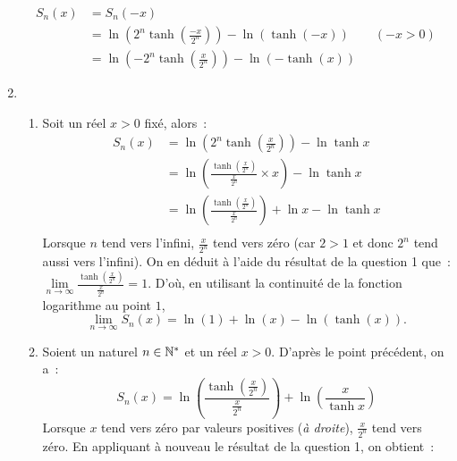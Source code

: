 \begin{exercice}
\begin{enumerate}
            \begin{align*}
                S_n(x)  &= S_n(-x) \\
                        &= \ln\left(2^n\tanh\left(\frac{-x}{2^n}\right)\right) - \ln(\tanh(-x)) \qquad (-x>0)\\
                        &= \ln\left(-2^n\tanh\left(\frac{x}{2^n}\right)\right) - \ln(-\tanh(x))
            \end{align*}
        \item 
            \begin{enumerate}
                \item Soit un réel \(x>0\) fixé, alors~:
                    \begin{align*}
                        S_n(x)  &= \ln\left(2^n\tanh\left(\frac{x}{2^n}\right)\right) - \ln\tanh x\\
                        &= \ln\left(\frac{\tanh\left(\frac{x}{2^n}\right)}{\frac{x}{2^n}} \times x \right) - \ln\tanh x\\
                        &= \ln\left(\frac{\tanh\left(\frac{x}{2^n}\right)}{\frac{x}{2^n}} \right) + \ln x - \ln\tanh x\\
                    \end{align*}
                        Lorsque \(n\) tend vers l'infini, \(\frac{x}{2^n}\) tend vers zéro (car \(2>1\) et donc \(2^n\) tend aussi vers l'infini). On en déduit à l'aide du résultat de la question 1 que~: \(\lim\limits_{n\to \infty} \frac{\tanh\left(\frac{x}{2^n}\right)}{\frac{x}{2^n}} = 1\). D'où, en utilisant la continuité de la fonction logarithme au point \(1\),
                    \begin{equation*}
                        \lim\limits_{n\to\infty} S_n(x) = \ln(1) + \ln(x) - \ln(\tanh(x)).
                    \end{equation*}
                \item Soient un naturel \(n \in \mathbb{N}^*\) et un réel \(x>0\). D'après le point précédent, on a~:
                    \begin{equation*}
                        S_n(x)= \ln\left(\frac{\tanh\left(\frac{x}{2^n}\right)}{\frac{x}{2^n}} \right) + \ln\left(\frac{x}{\tanh x}\right)
                    \end{equation*}
                    Lorsque \(x\) tend vers zéro par valeurs positives (\emph{à droite}), \(\frac{x}{2^n}\) tend vers zéro. En appliquant à nouveau le résultat de la question 1, on obtient~:
                    \begin{equation*}

\end{equation*}
\end{enumerate}
\end{enumerate}
\end{exercice}
